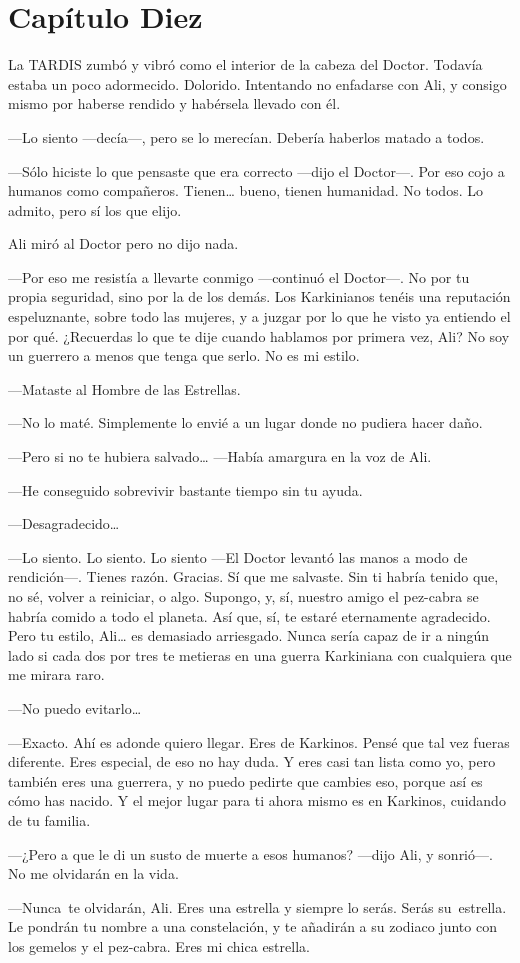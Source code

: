 \chapter*{Capítulo Diez}


La TARDIS zumbó y vibró como el interior de la cabeza del Doctor.
Todavía estaba un poco adormecido. Dolorido. Intentando no enfadarse con
Ali, y consigo mismo por haberse rendido y habérsela llevado con él.

---Lo siento ---decía---, pero se lo merecían. Debería haberlos matado a
todos.

---Sólo hiciste lo que pensaste que era correcto ---dijo el Doctor---.
Por eso cojo a humanos como compañeros. Tienen\ldots{} bueno, tienen
humanidad. No todos. Lo admito, pero sí los que elijo.

Ali miró al Doctor pero no dijo nada.

---Por eso me resistía a llevarte conmigo ---continuó el Doctor---. No
por tu propia seguridad, sino por la de los demás. Los Karkinianos
tenéis una reputación espeluznante, sobre todo las mujeres, y a juzgar
por lo que he visto ya entiendo el por qué. ¿Recuerdas lo que te dije
cuando hablamos por primera vez, Ali? No soy un guerrero a menos que
tenga que serlo. No es mi estilo.

---Mataste al Hombre de las Estrellas.

---No lo maté. Simplemente lo envié a un lugar donde no pudiera hacer
daño.

---Pero si no te hubiera salvado\ldots{} ---Había amargura en la voz de
Ali.

---He conseguido sobrevivir bastante tiempo sin tu ayuda.

---Desagradecido\ldots{}

---Lo siento. Lo siento. Lo siento ---El Doctor levantó las manos a modo
de rendición---. Tienes razón. Gracias. Sí que me salvaste. Sin ti
habría tenido que, no sé, volver a reiniciar, o algo. Supongo, y, sí,
nuestro amigo el pez-cabra se habría comido a todo el planeta. Así que,
sí, te estaré eternamente agradecido. Pero tu estilo, Ali\ldots{} es
demasiado arriesgado. Nunca sería capaz de ir a ningún lado si cada dos
por tres te metieras en una guerra Karkiniana con cualquiera que me
mirara raro.

---No puedo evitarlo\ldots{}

---Exacto. Ahí es adonde quiero llegar. Eres de Karkinos. Pensé que tal
vez fueras diferente. Eres especial, de eso no hay duda. Y eres casi tan
lista como yo, pero también eres una guerrera, y no puedo pedirte que
cambies eso, porque así es cómo has nacido. Y el mejor lugar para ti
ahora mismo es en Karkinos, cuidando de tu familia.

---¿Pero a que le di un susto de muerte a esos humanos? ---dijo Ali, y
sonrió---. No me olvidarán en la vida.

---Nunca~te olvidarán, Ali. Eres una estrella y siempre lo serás. Serás
su~estrella. Le pondrán tu nombre a una constelación, y te añadirán a su
zodiaco junto con los gemelos y el pez-cabra. Eres mi chica estrella.